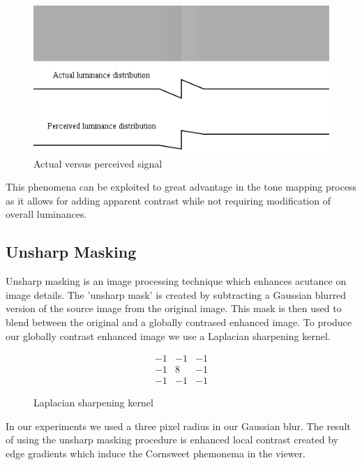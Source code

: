 \documentclass[twocolumn]{article}
\begin{document}
\begin{figure}[h!]
	\centering
	\includegraphics[scale=0.375]{cornsweet}
	\caption{Actual versus perceived signal\cite{wiki_corn}}
\end{figure}

This phenomena can be exploited to great advantage in the tone mapping process as it allows for adding apparent contrast while not requiring modification of overall luminances.

\subsection{Unsharp Masking}

Unsharp masking is an image processing technique which enhances acutance on image details. The 'unsharp mask' is created by subtracting a Gaussian blurred version of the source image from the original image. This mask is then used to blend between the original and a globally contrased enhanced image. To produce our globally contrast enhanced image we use a Laplacian sharpening kernel. 

\begin{figure}[h!]
	\centering
\[  \begin{array}{ccc}
-1 & -1 & -1 \\
-1 &  8 & -1 \\
-1 & -1 & -1 \end{array} \] 
\caption{Laplacian sharpening kernel}
\end{figure}

In our experiments we used a three pixel radius in our Gaussian blur. The result of using the unsharp masking procedure is enhanced local contrast created by edge gradients which induce the Cornsweet phemonema in the viewer.
\end{document}
